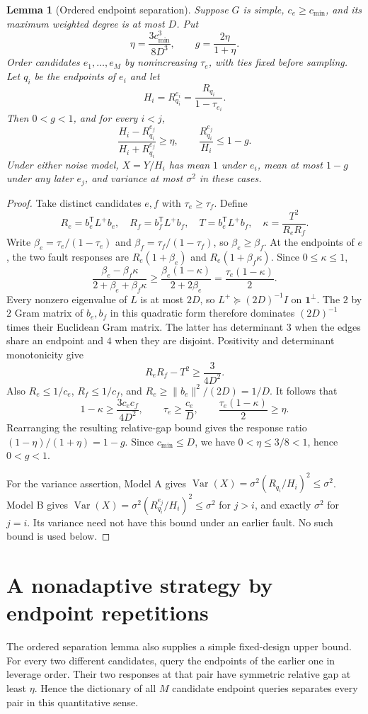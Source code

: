 \documentclass[11pt,letterpaper]{article}
\newtheorem{lemma}[theorem]{Lemma}
\newcommand{\one}{\mathbf 1}
\DeclareMathOperator{\Var}{Var}
\begin{document}
\begin{lemma}[Ordered endpoint separation]\label{lem:ordered}
Suppose $G$ is simple, $c_e\ge c_{\min}$, and its maximum weighted degree is at most $D$. Put
\[
 \eta=\frac{3c_{\min}^3}{8D^3},\qquad
 g=\frac{2\eta}{1+\eta}.
\]
Order candidates $e_1,\ldots,e_M$ by nonincreasing $\tau_e$, with ties fixed before sampling. Let $q_i$ be the endpoints of $e_i$ and let
\[
 H_i=R_{q_i}^{e_i}=\frac{R_{q_i}}{1-\tau_{e_i}}.
\]
Then $0<g<1$, and for every $i<j$,
\[
 \frac{H_i-R_{q_i}^{e_j}}{H_i+R_{q_i}^{e_j}}\ge\eta,
 \qquad \frac{R_{q_i}^{e_j}}{H_i}\le1-g.
\]
Under either noise model, $X=Y/H_i$ has mean $1$ under $e_i$, mean at most $1-g$ under any later $e_j$, and variance at most $\sigma^2$ in these cases.
\end{lemma}
\begin{proof}
Take distinct candidates $e,f$ with $\tau_e\ge\tau_f$. Define
\[
 R_e=b_e^{\mathsf T}L^+b_e,\quad R_f=b_f^{\mathsf T}L^+b_f,\quad
 T=b_e^{\mathsf T}L^+b_f,\quad \kappa=\frac{T^2}{R_eR_f}.
\]
Write $\beta_e=\tau_e/(1-\tau_e)$ and $\beta_f=\tau_f/(1-\tau_f)$, so $\beta_e\ge\beta_f$. At the endpoints of $e$, the two fault responses are $R_e(1+\beta_e)$ and $R_e(1+\beta_f\kappa)$. Since $0\le\kappa\le1$,
\[
 \frac{\beta_e-\beta_f\kappa}{2+\beta_e+\beta_f\kappa}
 \ge\frac{\beta_e(1-\kappa)}{2+2\beta_e}
 =\frac{\tau_e(1-\kappa)}2.
\]
Every nonzero eigenvalue of $L$ is at most $2D$, so $L^+\succeq(2D)^{-1}I$ on $\one^\perp$. The $2$ by $2$ Gram matrix of $b_e,b_f$ in this quadratic form therefore dominates $(2D)^{-1}$ times their Euclidean Gram matrix. The latter has determinant $3$ when the edges share an endpoint and $4$ when they are disjoint. Positivity and determinant monotonicity give
\[
 R_eR_f-T^2\ge\frac{3}{4D^2}.
\]
Also $R_e\le1/c_e$, $R_f\le1/c_f$, and $R_e\ge\|b_e\|^2/(2D)=1/D$. It follows that
\[
 1-\kappa\ge\frac{3c_ec_f}{4D^2},\qquad
 \tau_e\ge\frac{c_e}{D},\qquad
 \frac{\tau_e(1-\kappa)}2\ge\eta.
\]
Rearranging the resulting relative-gap bound gives the response ratio $(1-\eta)/(1+\eta)=1-g$. Since $c_{\min}\le D$, we have $0<\eta\le3/8<1$, hence $0<g<1$.

For the variance assertion, Model A gives $\Var(X)=\sigma^2(R_{q_i}/H_i)^2\le\sigma^2$. Model B gives $\Var(X)=\sigma^2(R_{q_i}^{e_j}/H_i)^2\le\sigma^2$ for $j>i$, and exactly $\sigma^2$ for $j=i$. Its variance need not have this bound under an earlier fault. No such bound is used below.
\end{proof}

\section{A nonadaptive strategy by endpoint repetitions}\label{sec:nonadaptive-upper}
The ordered separation lemma also supplies a simple fixed-design upper bound. For every two different candidates, query the endpoints of the earlier one in leverage order. Their two responses at that pair have symmetric relative gap at least $\eta$. Hence the dictionary of all $M$ candidate endpoint queries separates every pair in this quantitative sense.
\end{document}
